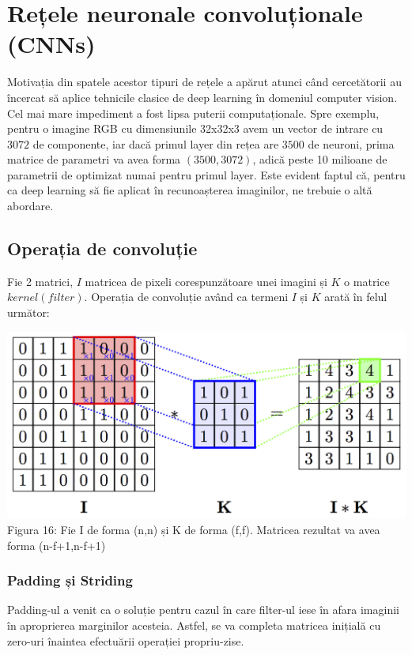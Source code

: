 \section{Rețele neuronale convoluționale (CNNs)}

Motivația din spatele acestor tipuri de rețele a apărut atunci când cercetătorii au încercat să aplice tehnicile clasice de deep learning în domeniul computer vision. Cel mai mare impediment a fost lipsa puterii computaționale. Spre exemplu, pentru o imagine RGB cu dimensiunile 32x32x3 avem un vector de intrare cu $3072$ de componente, iar dacă primul layer din rețea are $3500$ de neuroni, prima matrice de parametri va avea forma $(3500, 3072)$, adică peste 10 milioane de parametrii de optimizat numai pentru primul layer. Este evident faptul că, pentru ca deep learning să fie aplicat în recunoașterea imaginilor, ne trebuie o altă abordare.

\subsection{Operația de convoluție}
Fie 2 matrici, $I$ matricea de pixeli corespunzătoare unei imagini și $K$ o matrice $kernel (filter)$. Operația de convoluție având ca termeni $I$ și $K$ arată în felul următor:

\begin{center}
\includegraphics[scale=1.5]{convolution} \\
Figura 16: Fie I de forma (n,n) și K de forma (f,f). Matricea rezultat va avea forma (n-f+1,n-f+1)
\end{center}


\subsubsection{Padding și Striding}
Padding-ul a venit ca o soluție pentru cazul în care filter-ul iese în afara imaginii în aproprierea marginilor acesteia. Astfel, se va completa matricea inițială cu zero-uri înaintea efectuării operației propriu-zise.

